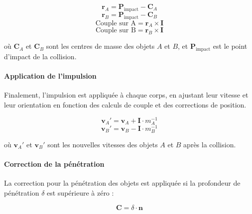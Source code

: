 \begin{multicols}{2}
        \begin{equation}
        \mathbf{r}_A = \mathbf{P}_{\text{impact}} - \mathbf{C}_A
        \end{equation}
        \begin{equation}
        \mathbf{r}_B = \mathbf{P}_{\text{impact}} - \mathbf{C}_B
        \end{equation}
        \begin{equation}
        \text{Couple sur A} = \mathbf{r}_A \times \mathbf{I}
        \end{equation}
        \begin{equation}
        \text{Couple sur B} = \mathbf{r}_B \times \mathbf{I}
        \end{equation}

        où \( \mathbf{C}_A \) et \( \mathbf{C}_B \) sont les centres de masse des
        objets \( A \) et \( B \), et \( \mathbf{P}_{\text{impact}} \) est le point
        d'impact de la collision.
        
        \paragraph{Application de l'impulsion}
        Finalement, l'impulsion est appliquée à chaque corps, en ajustant leur vitesse et
        leur orientation en fonction des calculs de couple et des corrections de position.
        
        \begin{equation}
        \mathbf{v}_A' = \mathbf{v}_A + \mathbf{I} \cdot m_A^{-1}
        \end{equation}
        \begin{equation}
        \mathbf{v}_B' = \mathbf{v}_B - \mathbf{I} \cdot m_B^{-1}
        \end{equation}

        où \( \mathbf{v}_A' \) et \( \mathbf{v}_B' \) sont les nouvelles vitesses des
        objets \( A \) et \( B \) après la collision.
        
        \paragraph{Correction de la pénétration}
        La correction pour la pénétration des objets est appliquée si la profondeur de
        pénétration \( \delta \) est supérieure à zéro :
        
        \[
        \mathbf{C} = \delta \cdot \mathbf{n}
        \]
        

\end{multicols}
